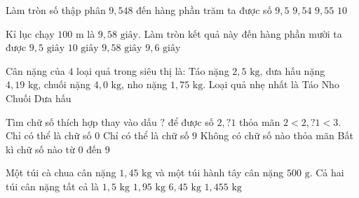 \begin{ex} %
Làm tròn số thập phân $9{,}548$ đến hàng phần trăm ta được số
\choice
{$9{,}5$}
{$9{,}54$}
{\True $9{,}55$}
{$10$}
\end{ex}

\begin{ex} %
Kỉ lục chạy $100\text{ m}$ là $9{,}58\text{ giây}$. Làm tròn kết quả này đến hàng phần mười ta được
\choice
{$9{,}5\text{ giây}$}
{$10\text{ giây}$}
{$9{,}58\text{ giây}$}
{\True $9{,}6\text{ giây}$}
\end{ex}

\begin{ex} %
Cân nặng của $4$ loại quả trong siêu thị là: Táo nặng $2{,}5\text{ kg}$, dưa hấu nặng $4{,}19\text{ kg}$, chuối nặng $4{,}0\text{ kg}$, nho nặng $1{,}75\text{ kg}$. Loại quả nhẹ nhất là
\choice
{Táo}
{\True Nho}
{Chuối}
{Dưa hấu}
\end{ex}

\begin{ex} %
Tìm chữ số thích hợp thay vào dấu $?$ để được số $2{,}?1$ thỏa mãn $2 < 2{,}?1 < 3$.
\choice
{Chỉ có thể là chữ số $0$}
{Chỉ có thể là chữ số $9$}
{Không có chữ số nào thỏa mãn}
{\True Bất kì chữ số nào từ $0$ đến $9$}
\end{ex}

\begin{ex} %
Một túi cà chua cân nặng $1{,}45\text{ kg}$ và một túi hành tây cân nặng $500\text{ g}$. Cả hai túi cân nặng tất cả là
\choice
{$1{,}5\text{ kg}$}
{\True $1{,}95\text{ kg}$}
{$6{,}45\text{ kg}$}
{$1{,}455\text{ kg}$}
\end{ex}

